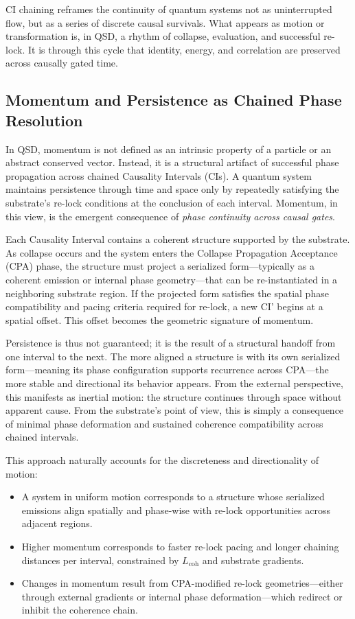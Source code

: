 \documentclass[preprints,article,submit,pdftex,moreauthors]{Definitions/mdpi}
\begin{document}
CI chaining reframes the continuity of quantum systems not as uninterrupted flow, but as a series of discrete causal survivals. What appears as motion or transformation is, in QSD, a rhythm of collapse, evaluation, and successful re-lock. It is through this cycle that identity, energy, and correlation are preserved across causally gated time.

\subsection{Momentum and Persistence as Chained Phase Resolution}

In QSD, momentum is not defined as an intrinsic property of a particle or an abstract conserved vector. Instead, it is a structural artifact of successful phase propagation across chained Causality Intervals (CIs). A quantum system maintains persistence through time and space only by repeatedly satisfying the substrate’s re-lock conditions at the conclusion of each interval. Momentum, in this view, is the emergent consequence of \emph{phase continuity across causal gates}.

Each Causality Interval contains a coherent structure supported by the substrate. As collapse occurs and the system enters the Collapse Propagation Acceptance (CPA) phase, the structure must project a serialized form—typically as a coherent emission or internal phase geometry—that can be re-instantiated in a neighboring substrate region. If the projected form satisfies the spatial phase compatibility and pacing criteria required for re-lock, a new CI' begins at a spatial offset. This offset becomes the geometric signature of momentum.

Persistence is thus not guaranteed; it is the result of a structural handoff from one interval to the next. The more aligned a structure is with its own serialized form—meaning its phase configuration supports recurrence across CPA—the more stable and directional its behavior appears. From the external perspective, this manifests as inertial motion: the structure continues through space without apparent cause. From the substrate's point of view, this is simply a consequence of minimal phase deformation and sustained coherence compatibility across chained intervals.

This approach naturally accounts for the discreteness and directionality of motion:
\begin{itemize}
    \item A system in uniform motion corresponds to a structure whose serialized emissions align spatially and phase-wise with re-lock opportunities across adjacent regions.
    \item Higher momentum corresponds to faster re-lock pacing and longer chaining distances per interval, constrained by $L_{\text{coh}}$ and substrate gradients.
    \item Changes in momentum result from CPA-modified re-lock geometries—either through external gradients or internal phase deformation—which redirect or inhibit the coherence chain.
\end{itemize}
\end{document}
